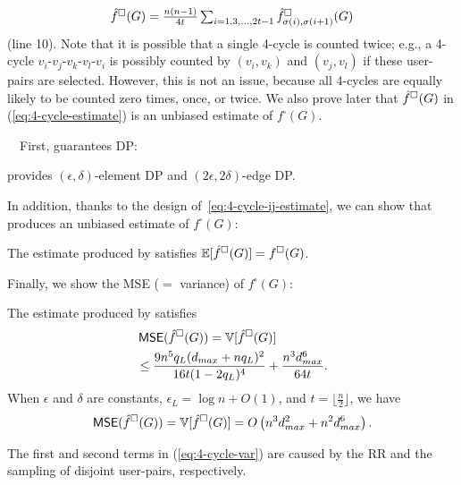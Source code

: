 \begin{equation}\label{eq:4-cycle-estimate}
  \textstyle{\hat{f}^\square(G) = \frac{n(n-1)}{4t}\sum_{i=1,3,\ldots,2t-1} \hat{f}_{\sigma(i),\sigma(i+1)}^\square(G)}
\end{equation}
(line 10). 
Note that it is possible that a single 4-cycle is counted twice; e.g., 
a 4-cycle $v_i$-$v_j$-$v_k$-$v_l$-$v_i$ is possibly counted by $(v_i,v_k)$ and $(v_j,v_l)$ if these user-pairs are selected. 
However, this is not an issue, because all 4-cycles are equally likely to be counted zero times, once, or twice. 
We also prove later that $\hat{f}^\square(G)$ in (\ref{eq:4-cycle-estimate}) is an unbiased estimate of $f^\square(G)$. 

\smallskip
{}~~First, \AlgWSCyc{} guarantees DP:
\begin{theorem}\label{thm:DP_IV}
\AlgWSCyc{} provides $(\epsilon, \delta)$-element DP and $(2\epsilon, 2\delta)$-edge DP.
\end{theorem}

In addition, thanks to the design of~\eqref{eq:4-cycle-ij-estimate}, we can show that \AlgWSCyc{} produces an unbiased estimate of $f^\square(G)$:
\begin{theorem}\label{thm:unbiased_IV}
  The estimate produced by \AlgWSCyc{} satisfies $\allowbreak \mathbb{E}[\hat{f}^\square(G)] =
  f^\square(G)$.
\end{theorem}

Finally, we show the MSE ($=$ variance) of $f^\square(G)$:

\begin{theorem}\label{thm:l2-loss_IV}
  The estimate produced by \AlgWSCyc{} satisfies 
  \begin{align}
    & \operatorname{\textsf{MSE}}(\hat{f}^\square(G)) = \mathbb{V}[\hat{f}^\square(G)] \nonumber \\
    &\leq \frac{9n^5 q_L(d_{max} +
    nq_L)^2}{16t(1-2q_L)^4} + \frac{n^3d_{max}^6}{64t}. \label{eq:4-cycle-var}
  \end{align}
  When $\epsilon$ and $\delta$ are constants, $\epsilon_L = \log n + O(1)$, and $t
  = \lfloor \frac{n}{2} \rfloor$, we have
  \begin{equation}\label{eq:4-cycle-var-simp}
    \operatorname{\textsf{MSE}}(\hat{f}^\square(G)) = \mathbb{V}[\hat{f}^\square(G)] 
    = O\left( n^3 d_{max}^2 + n^2d_{max}^6 \right).
  \end{equation}
\end{theorem}
The first and second terms in (\ref{eq:4-cycle-var}) are caused by the RR and the sampling of disjoint user-pairs, respectively. 

